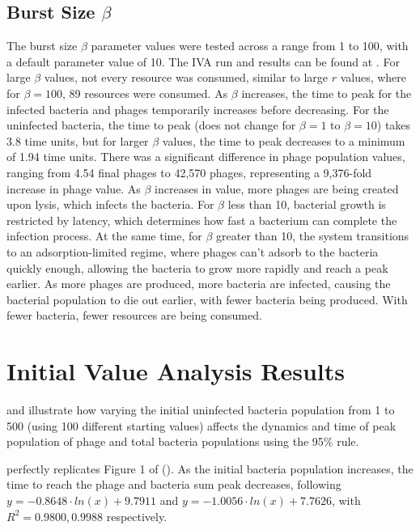 \subsection{Burst Size $\beta$}
The burst size $\beta$ parameter values were tested across a range from 1 to 100, with a default parameter value of 10. 
The IVA run and results can be found at . 
For large $\beta$ values, not every resource was consumed, similar to large $r$ values, where for $\beta=100$, 89 resources were consumed. 
As $\beta$ increases, the time to peak for the infected bacteria and phages temporarily increases before decreasing. 
For the uninfected bacteria, the time to peak (does not change for $\beta=1$ to $\beta=10$) takes 3.8 time units, but for larger $\beta$ values, the time to peak decreases to a minimum of 1.94 time units. 
There was a significant difference in phage population values, ranging from 4.54 final phages to 42,570 phages, representing a 9,376-fold increase in phage value. 
As $\beta$ increases in value, more phages are being created upon lysis, which infects the bacteria. 
For $\beta$ less than 10, bacterial growth is restricted by latency, which determines how fast a bacterium can complete the infection process. At the same time, for $\beta$ greater than 10, the system transitions to an adsorption-limited regime, where phages can't adsorb to the bacteria quickly enough, allowing the bacteria to grow more rapidly and reach a peak earlier. 
As more phages are produced, more bacteria are infected, causing the bacterial population to die out earlier, with fewer bacteria being produced. 
With fewer bacteria, fewer resources are being consumed. 

\section{Initial Value Analysis Results}
\label{sec:results:initial_value_analysis}
 and  illustrate how varying the initial uninfected bacteria population from 1 to 500 (using 100 different starting values) affects the dynamics and time of peak population of phage and total bacteria populations using the 95\% rule. 

 perfectly replicates Figure 1 of \citet{mullaExtremeDiversityPhage2024} (). 
As the initial bacteria population increases, the time to reach the phage and bacteria sum peak decreases, following $y = -0.8648\cdot ln(x) + 9.7911$ and $y = -1.0056\cdot ln(x)+7.7626$, with $R^2=0.9800, 0.9988$ respectively. 

